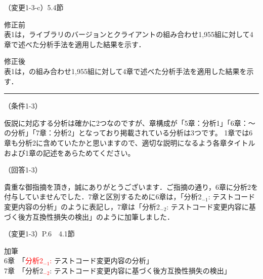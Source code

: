 \documentclass{jarticle} %
\def\subsection#1{ \vspace{1pc} {\gt #1} }
\def\nextans{ \vspace{2pc} \hrule }
\begin{document}
\subsection{（変更1-3-c）5.4節}
\vspace{-0.3cm}
\begin{description}
\item 修正前\\
\phantom{　}
表1は，ライブラリのバージョンとクライアントの組み合わせ1,955組に対して4章で述べた分析手法を適用した結果を示す．
\vspace{-0.3cm}
\item 修正後\\
\phantom{　}
表1は，\textcolor{red}{}の組み合わせ1,955組に対して4章で述べた分析手法を適用した結果を示す．
\end{description}

\newpage
\nextans
\subsection{（条件1-3）}

仮説に対応する分析は確かに2つなのですが、章構成が「5章：分析1」「6章：～の分析」「7章：分析2」となっており掲載されている分析は3つです。
1章では6章も分析2に含めていたかと思いますので、適切な説明になるよう各章タイトルおよび1章の記述をあらためてください。

\subsection{（回答1-3）}

貴重な御指摘を頂き，誠にありがとうございます．ご指摘の通り，6章に分析2を付与していませんでした．7章と区別するために6章は，「分析2$_{-1}$: テストコード変更内容の分析」のように表記し，7章は「分析2$_{-2}$: テストコード変更内容に基づく後方互換性損失の検出」のように加筆しました．


\subsection{（変更1-3）P.6　4.1節}
\vspace{-0.3cm}
\begin{description}
\item 加筆\\
\noindent6章　「\textcolor{red}{分析2$_{-1}$: }テストコード変更内容の分析」\\
\noindent7章　「分析2\textcolor{red}{$_{-2}$}: テストコード変更内容に基づく後方互換性損失の検出」\\
\end{description}
\end{document}
